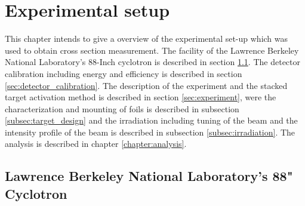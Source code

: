 \chapter{Experimental setup}
This chapter intends to give a overview of the experimental set-up which was used to obtain cross section measurement. The facility of the Lawrence Berkeley National Laboratory's 88-Inch cyclotron is described in section \ref{sec:LBNL-88}. The detector calibration including energy and efficiency is described in section \ref{sec:detector_calibration}. The description of the experiment and the stacked target activation method is described in section \ref{sec:experiment}, were the characterization and mounting of foils is described in subsection \ref{subsec:target_design} and the irradiation including tuning of the beam and the intensity profile of the beam is described in subsection \ref{subsec:irradiation}. The analysis is described in chapter \ref{chapter:analysis}. 


\section{Lawrence Berkeley National Laboratory's 88" Cyclotron} \label{sec:LBNL-88}

